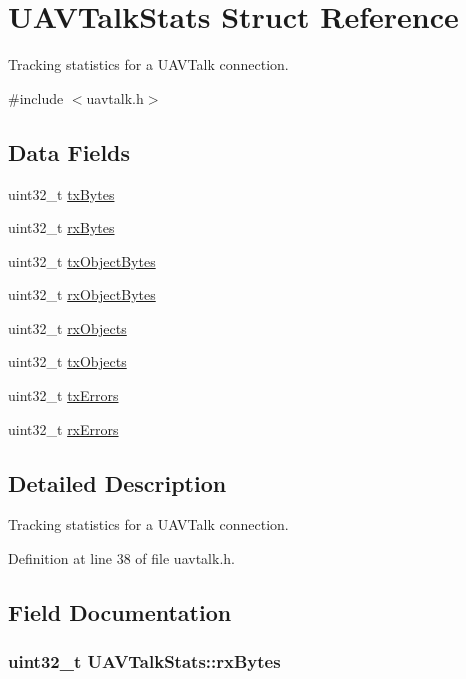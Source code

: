 \hypertarget{struct_u_a_v_talk_stats}{\section{\-U\-A\-V\-Talk\-Stats \-Struct \-Reference}
\label{struct_u_a_v_talk_stats}
}


\-Tracking statistics for a \-U\-A\-V\-Talk connection.  




{\ttfamily \#include $<$uavtalk.\-h$>$}

\subsection*{\-Data \-Fields}
\begin{DoxyCompactItemize}
\item 
uint32\-\_\-t \hyperlink{struct_u_a_v_talk_stats_a7d5a1c5d207383ebd5b62b27b78ec264}{tx\-Bytes}
\item 
uint32\-\_\-t \hyperlink{struct_u_a_v_talk_stats_af98fb7a9d72619f9ad84628b20ffcbdf}{rx\-Bytes}
\item 
uint32\-\_\-t \hyperlink{struct_u_a_v_talk_stats_ad2f1c1147e9062cfeaeaf21ea076434c}{tx\-Object\-Bytes}
\item 
uint32\-\_\-t \hyperlink{struct_u_a_v_talk_stats_a5adb8d84e7dfe9f3aa1a03a6c057f2fd}{rx\-Object\-Bytes}
\item 
uint32\-\_\-t \hyperlink{struct_u_a_v_talk_stats_abe87f216fd1bb8fdb474a61d467d7b41}{rx\-Objects}
\item 
uint32\-\_\-t \hyperlink{struct_u_a_v_talk_stats_a7f067b3f89c3ac3c274eb05f71557a6a}{tx\-Objects}
\item 
uint32\-\_\-t \hyperlink{struct_u_a_v_talk_stats_af325955ebac8f234145deefefdea9dbe}{tx\-Errors}
\item 
uint32\-\_\-t \hyperlink{struct_u_a_v_talk_stats_a0496877af8f1ce9110b2b42a58956e10}{rx\-Errors}
\end{DoxyCompactItemize}


\subsection{\-Detailed \-Description}
\-Tracking statistics for a \-U\-A\-V\-Talk connection. 

\-Definition at line 38 of file uavtalk.\-h.



\subsection{\-Field \-Documentation}
\hypertarget{struct_u_a_v_talk_stats_af98fb7a9d72619f9ad84628b20ffcbdf}{
\subsubsection[{rx\-Bytes}]{\setlength{\rightskip}{0pt plus 5cm}uint32\-\_\-t {\bf \-U\-A\-V\-Talk\-Stats\-::rx\-Bytes}}}\label{struct_u_a_v_talk_stats_af98fb7a9d72619f9ad84628b20ffcbdf}


